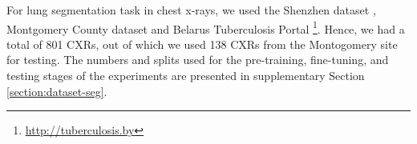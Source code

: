 \documentclass[10pt,journal,compsoc]{IEEEtran}
\begin{document}
For lung segmentation task in chest x-rays, we used the Shenzhen dataset \cite{jaeger2013automatic}, Montgomery County dataset \cite{candemir2013lung} and Belarus Tuberculosis Portal \footnote{\url{http://tuberculosis.by}}. Hence, we had a total of 801 CXRs, out of which we used 138 CXRs from the Montogomery site for testing.  
The numbers and splits used for the pre-training, fine-tuning, and testing stages of the experiments are presented in supplementary Section \ref{section:dataset-seg}.

\begin{table*}[t]
\centering
\caption{{Covid vs Non-Covid binary classification performance employing ViT-S. The RSNA \& RICORD training data (training data distribution) were used for fine-tuning, whereas all of COHEN, ACTMED, and pediatric data were only used for testing.}}
\label{tab:covid-non-covid}
\end{table*}
\end{document}
